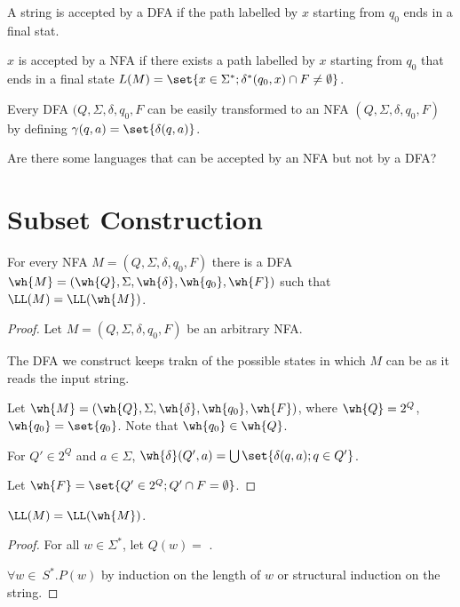\documentclass[11pt]{scrartcl}
\begin{document}
A string is accepted by a DFA if the path labelled by $x$ starting from $q_0$ ends in a final stat.

$x$ is accepted by a NFA if there exists a path labelled by $x$
starting from $q_0$ that ends in a final state $L(M) = \set{x\in \Sigma^{*}; \delta^{*}(q_0, x)\cap F \neq \emptyset}$.

Every DFA $(Q, \Sigma, \delta, q_0, F$ can be easily transformed to an
NFA $(Q, \Sigma, \delta, q_0, F)$ by defining $\gamma(q, a) = \set{\delta(q, a)}$. 
\begin{ques*}

Are there some languages that can be accepted by an NFA but not by a DFA?

\end{ques*}
\section{Subset Construction}

\begin{theorem}
For every NFA $M = (Q, \Sigma, \delta, q_0, F)$ there is a DFA $\wh{M} = (\wh{Q}, \Sigma, \wh{\delta}, \wh{q_0}, \wh{F})$ such that $\LL(M) = \LL(\wh{M})$.
\end{theorem}

\begin{proof}
  \hfill

Let $M = (Q, \Sigma, \delta, q_0, F)$ be an arbitrary NFA. 

The DFA we construct keeps trakn of the possible states in which $M$ can be as it reads the input string.

Let $\wh{M} = (\wh{Q}, \Sigma, \wh{\delta}, \wh{q_0}, \wh{F})$, where $\wh{Q} = 2^{Q}$, $\wh{q_0} = \set{ q_0}$. Note that $\wh{q_0}\in \wh{Q}$.

For $Q'\in 2^Q$ and $a\in \Sigma$,
$\wh{\delta}(Q', a) = \bigcup \set{\delta(q, a);q\in Q'}$.

Let $\wh{F} = \set{Q' \in 2^Q; Q' \cap F = \emptyset}$.
\end{proof}
\begin{claim*}
$\LL(M) = \LL(\wh{M})$.
\end{claim*}
\begin{proof}
  \hfill

  For all $w\in \Sigma^{*}$, let $Q(w) = $
  .

  $\forall w\in ~S^{*}. P(w)$ by induction on the length of $w$ or
  structural induction on the string.
\end{proof}
\end{document}

